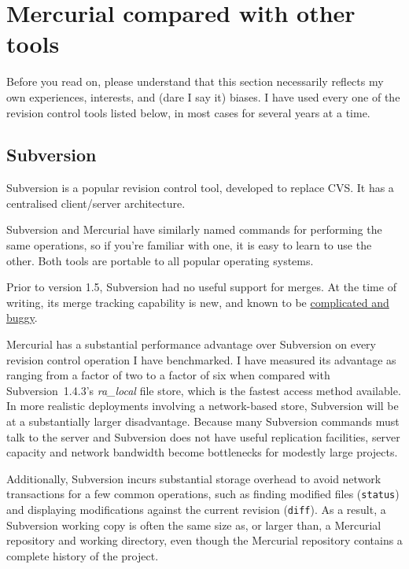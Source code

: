 \section{Mercurial compared with other tools}

Before you read on, please understand that this section necessarily
reflects my own experiences, interests, and (dare I say it) biases.  I
have used every one of the revision control tools listed below, in
most cases for several years at a time.


\subsection{Subversion}

Subversion is a popular revision control tool, developed to replace
CVS.  It has a centralised client/server architecture.

Subversion and Mercurial have similarly named commands for performing
the same operations, so if you're familiar with one, it is easy to
learn to use the other.  Both tools are portable to all popular
operating systems.

Prior to version 1.5, Subversion had no useful support for merges.
At the time of writing, its merge tracking capability is new, and known to be
\href{http://svnbook.red-bean.com/nightly/en/svn.branchmerge.advanced.html#svn.branchmerge.advanced.finalword}{complicated and buggy}.

Mercurial has a substantial performance advantage over Subversion on
every revision control operation I have benchmarked.  I have measured
its advantage as ranging from a factor of two to a factor of six when
compared with Subversion~1.4.3's \emph{ra\_local} file store, which is
the fastest access method available.  In more realistic deployments
involving a network-based store, Subversion will be at a substantially
larger disadvantage.  Because many Subversion commands must talk to
the server and Subversion does not have useful replication facilities,
server capacity and network bandwidth become bottlenecks for modestly
large projects.

Additionally, Subversion incurs substantial storage overhead to avoid
network transactions for a few common operations, such as finding
modified files (\texttt{status}) and displaying modifications against
the current revision (\texttt{diff}).  As a result, a Subversion
working copy is often the same size as, or larger than, a Mercurial
repository and working directory, even though the Mercurial repository
contains a complete history of the project.

